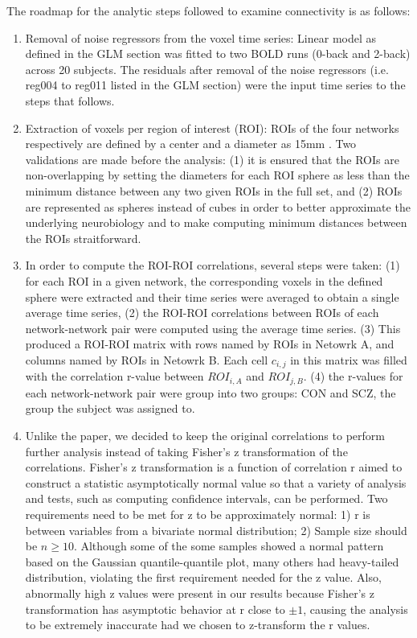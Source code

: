 \documentclass[11pt]{article}
\begin{document}
The roadmap for the analytic steps followed to examine connectivity is as
follows:

\begin{enumerate}
  \item Removal of noise regressors from the voxel time series: Linear model as
    defined in the GLM section was fitted to two BOLD runs (0-back and 2-back) across 20 subjects.
    The residuals  after removal of the noise regressors (i.e. reg004 to reg011 
    listed in the GLM section) were the input time series to the steps that follows.
  \item Extraction of voxels per region of interest (ROI): ROIs of the four
    networks respectively are defined by a center and a diameter as 15mm \cite{repovs2012}. Two 
    validations are made before the analysis: (1) it is ensured that the ROIs are 
    non-overlapping by setting the diameters for each ROI sphere as less than 
    the minimum distance between any two given ROIs in the full set, and 
    (2) ROIs are represented as spheres instead of cubes in order to better 
    approximate the underlying neurobiology and to make computing minimum distances 
    between the ROIs straitforward.
  \item In order to compute the ROI-ROI correlations, several steps were
    taken: (1) for each ROI in a given network, the corresponding voxels in the defined
    sphere were extracted and their time series were averaged to obtain a single average 
    time series, (2) the ROI-ROI correlations between ROIs of each network-network pair 
    were computed using the average time series. (3) This produced a ROI-ROI matrix
    with rows named by ROIs in Netowrk A, and columns named by ROIs in Netowrk B. 
    Each cell $c_{i,j}$ in this matrix was filled with the correlation r-value between 
    $ROI_{i, A}$ and $ROI_{j, B}$. (4) the r-values for each network-network pair were
    group into two groups: CON and SCZ, the group the subject was assigned to.
  \item Unlike the paper, we decided to keep the original correlations to perform 
    further analysis instead of taking Fisher's z transformation of the correlations. 
    Fisher's z transformation is a function of correlation r aimed to construct a 
    statistic asymptotically normal value so that a variety of analysis and tests, such 
    as computing confidence intervals, can be performed. Two requirements need to be 
    met for z to be approximately normal: 1) r is between variables from a bivariate 
    normal distribution; 2) Sample size should be $n \geq 10$. Although some of the some 
    samples showed a normal pattern based on the Gaussian quantile-quantile plot, many others 
    had heavy-tailed distribution, violating the first requirement needed for the z value. 
    Also, abnormally high z values were present in our results because Fisher's z
    transformation has asymptotic behavior at r close to $ \pm 1$, causing the analysis to be
    extremely inaccurate had we chosen to z-transform the r values.
\end{enumerate}
\end{document}
